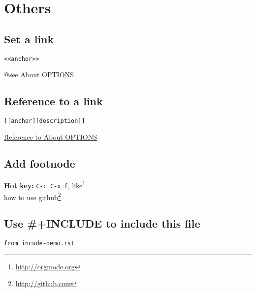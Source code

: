 \documentclass[11pt]{article}
\begin{document}
\section{Others}
\label{sec-2}
\subsection{Set a link}
\label{sec-2-1}
\begin{verbatim}
<<anchor>>
\end{verbatim}
@see About OPTIONS

\subsection{Reference to a link}
\label{sec-2-2}
\begin{verbatim}
[[anchor][description]]
\end{verbatim}
\hyperref[About-OPTIONS]{Reference to About OPTIONS}

\subsection{Add footnode}
\label{sec-2-3}
\textbf{Hot key:} \verb~C-c C-x f~, like\footnote{\url{http://orgmode.org}} \\
   how to use github\footnote{\url{http://github.com}}

\subsection{Use \#+INCLUDE to include this file}
\label{sec-2-4}
\begin{verbatim}
from incude-demo.rst
\end{verbatim}
\end{document}
